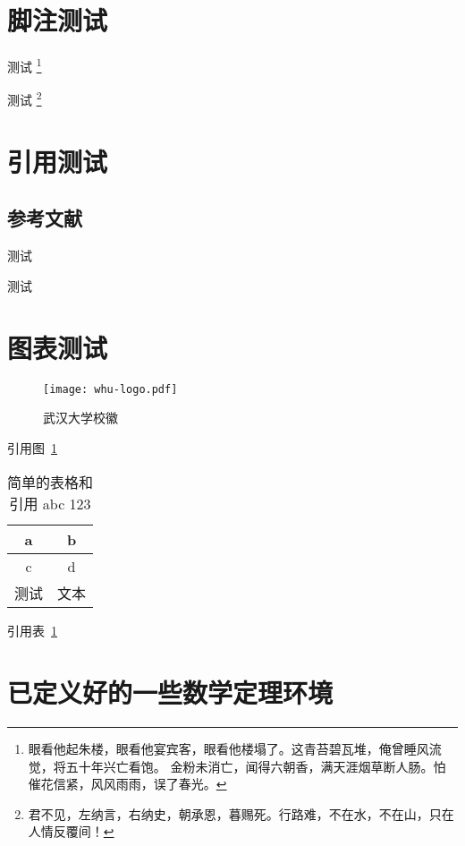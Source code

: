 \documentclass[type = master]{whu-thesis}
\begin{document}
\section{脚注测试}

测试 \footnote{眼看他起朱楼，眼看他宴宾客，眼看他楼塌了。这青苔碧瓦堆，俺曾睡风流觉，将五十年兴亡看饱。
金粉未消亡，闻得六朝香，满天涯烟草断人肠。怕催花信紧，风风雨雨，误了春光。}

测试 \footnote[3]{君不见，左纳言，右纳史，朝承恩，暮赐死。行路难，不在水，不在山，只在人情反覆间！}


\section{引用测试}

\subsection{参考文献}

测试%

测试%



\section{图表测试}

\begin{figure}[ht]
  \centering
  \texttt{[image: whu-logo.pdf]}
  \caption{武汉大学校徽}
  \label{fig:武汉大学校徽}
\end{figure}

引用图~\ref{fig:武汉大学校徽}

\begin{table}[ht]
  \centering
  \caption{%
    简单的表格和引用 abc 123 %
  }
  \label{table:简单的表格}
  \begin{tabular}{cc}
    \hline
    a & b \\ \hline
    c & d \\ \hline
    测试 & 文本 \\ \hline
  \end{tabular}
\end{table}

引用表~\ref{table:简单的表格}


\section{已定义好的一些数学定理环境}
\end{document}
